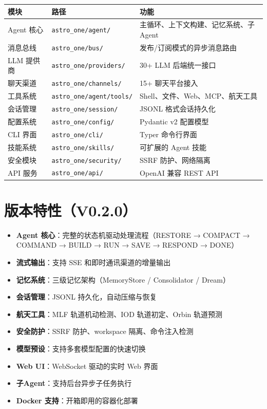 \documentclass[12pt,a4paper,UTF8]{ctexart}
\begin{document}
\begin{longtable}{L{3cm} L{4cm} L{8cm}}
\toprule
\textbf{模块} & \textbf{路径} & \textbf{功能} \\
\midrule
Agent 核心 & \texttt{astro\_one/agent/} & 主循环、上下文构建、记忆系统、子Agent \\
消息总线 & \texttt{astro\_one/bus/} & 发布/订阅模式的异步消息路由 \\
LLM 提供商 & \texttt{astro\_one/providers/} & 30+ LLM 后端统一接口 \\
聊天渠道 & \texttt{astro\_one/channels/} & 15+ 聊天平台接入 \\
工具系统 & \texttt{astro\_one/agent/tools/} & Shell、文件、Web、MCP、航天工具 \\
会话管理 & \texttt{astro\_one/session/} & JSONL 格式会话持久化 \\
配置系统 & \texttt{astro\_one/config/} & Pydantic v2 配置模型 \\
CLI 界面 & \texttt{astro\_one/cli/} & Typer 命令行界面 \\
技能系统 & \texttt{astro\_one/skills/} & 可扩展的 Agent 技能 \\
安全模块 & \texttt{astro\_one/security/} & SSRF 防护、网络隔离 \\
API 服务 & \texttt{astro\_one/api/} & OpenAI 兼容 REST API \\
\bottomrule
\end{longtable}

\section{版本特性（V0.2.0）}

\begin{itemize}
    \item \textbf{Agent 核心}：完整的状态机驱动处理流程（RESTORE → COMPACT → COMMAND → BUILD → RUN → SAVE → RESPOND → DONE）
    \item \textbf{流式输出}：支持 SSE 和即时通讯渠道的增量输出
    \item \textbf{记忆系统}：三级记忆架构（MemoryStore / Consolidator / Dream）
    \item \textbf{会话管理}：JSONL 持久化，自动压缩与恢复
    \item \textbf{航天工具}：MLF 轨道机动检测、IOD 轨道初定、Orbin 轨道预测
    \item \textbf{安全防护}：SSRF 防护、workspace 隔离、命令注入检测
    \item \textbf{模型预设}：支持多套模型配置的快速切换
    \item \textbf{Web UI}：WebSocket 驱动的实时 Web 界面
    \item \textbf{子Agent}：支持后台异步子任务执行
    \item \textbf{Docker 支持}：开箱即用的容器化部署
\end{itemize}
\end{document}
